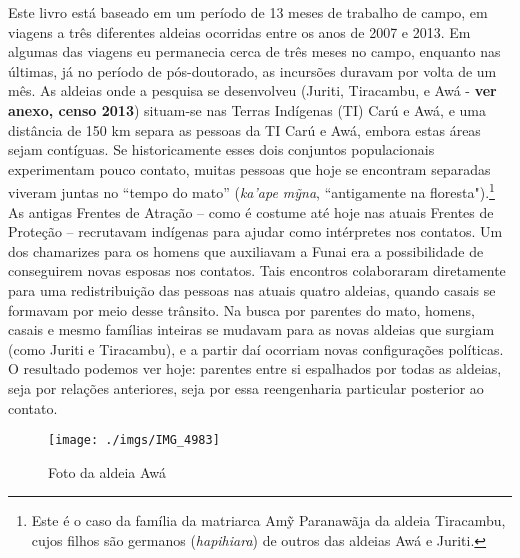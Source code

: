 Este livro está baseado em um período de 13 meses de trabalho de campo,
em viagens a três diferentes aldeias ocorridas entre os anos de 2007 e
2013. Em algumas das viagens eu permanecia cerca de três meses no campo,
enquanto nas últimas, já no período de pós-doutorado, as incursões
duravam por volta de um mês. As aldeias onde a pesquisa se desenvolveu
(Juriti, Tiracambu, e Awá - \textbf{ver anexo,
censo 2013})
 situam-se nas Terras Indígenas (TI) Carú e Awá, e uma
distância de 150 km separa as pessoas da TI Carú e Awá, embora estas áreas
sejam contíguas. Se historicamente esses dois conjuntos
populacionais experimentam pouco contato, muitas pessoas que hoje se
encontram separadas viveram juntas no ``tempo do mato'' (\emph{ka'ape
mỹna}, ``antigamente na floresta").\footnote{Este é o caso da família da
  matriarca Amỹ Paranawãja da aldeia Tiracambu, cujos filhos são
  germanos (\emph{hapihiara}) de outros das aldeias Awá e Juriti.} As
antigas Frentes de Atração -- como é costume até hoje nas atuais Frentes
de Proteção -- recrutavam indígenas para ajudar como intérpretes nos
contatos. Um dos chamarizes para os homens que auxiliavam a Funai era a
possibilidade de conseguirem novas esposas nos contatos. Tais encontros
colaboraram diretamente para uma redistribuição das pessoas nas atuais
quatro aldeias, quando casais se formavam por meio desse trânsito. Na
busca por parentes do mato, homens, casais e mesmo famílias inteiras se
mudavam para as novas aldeias que surgiam (como Juriti e Tiracambu), e a
partir daí ocorriam novas configurações políticas. O resultado podemos
ver hoje: parentes entre si espalhados por todas as aldeias, seja por
relações anteriores, seja por essa reengenharia particular posterior ao
contato.

\begin{figure}[H]
\centering
  \texttt{[image: ./imgs/IMG\_4983]}
\caption{Foto da aldeia Awá}
\end{figure}

